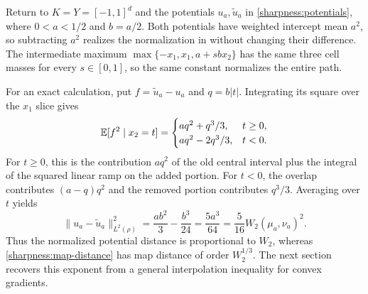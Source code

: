 \begin{remark}
Return to $K=Y=[-1,1]^d$ and the potentials $u_a,\widetilde u_a$ in
\eqref{sharpness:potentials}, where $0<a<1/2$ and $b=a/2$.
Both potentials have weighted intercept mean $a^2$, so subtracting
$a^2$ realizes the normalization in  without
changing their difference. The intermediate maximum
$\max\{-x_1,x_1,a+sbx_2\}$ has the same three cell masses for every
$s\in[0,1]$, so the same constant normalizes the entire path.

For an exact calculation, put $f=\widetilde u_a-u_a$ and
$q=b|t|$. Integrating its square over the $x_1$ slice gives
\[
 \mathbb E[f^2\mid x_2=t]=
 \begin{cases}
   aq^2+q^3/3,&t\ge0,\\
   aq^2-2q^3/3,&t<0.
 \end{cases}
\]
For $t\ge0$, this is the contribution $aq^2$ of the old central
interval plus the integral of the squared linear ramp on the added
portion. For $t<0$, the overlap contributes $(a-q)q^2$ and the
removed portion contributes $q^3/3$. Averaging over $t$ yields
\[
 \|u_a-\widetilde u_a\|_{L^2(\rho)}^2
 =\frac{ab^2}{3}-\frac{b^3}{24}
 =\frac{5a^3}{64}
 =\frac5{16}W_2(\mu_a,\nu_a)^2.
\]
Thus the normalized potential distance is proportional to $W_2$,
whereas \eqref{sharpness:map-distance} has map distance of order
$W_2^{1/3}$. The next section recovers this exponent from a general
interpolation inequality for convex gradients.
\end{remark}
